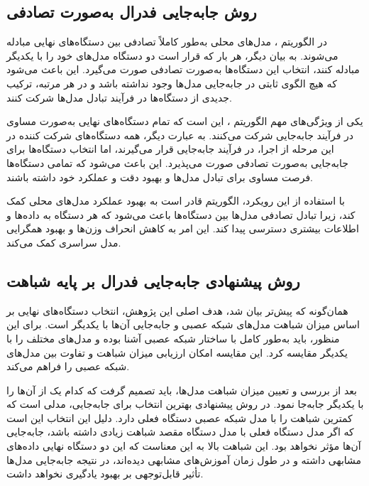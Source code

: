 \subsection{
روش جابه‌جایی فدرال به‌صورت تصادفی
}

در الگوریتم
%
، مدل‌های محلی به‌طور کاملاً تصادفی بین دستگاه‌های نهایی مبادله می‌شوند. به بیان دیگر، هر بار که قرار است دو دستگاه مدل‌های خود را با یکدیگر مبادله کنند، انتخاب این دستگاه‌ها به‌صورت تصادفی صورت می‌گیرد. این باعث می‌شود که هیچ الگوی ثابتی در جابه‌جایی مدل‌ها وجود نداشته باشد و در هر مرتبه، ترکیب جدیدی از دستگاه‌ها در فرآیند تبادل مدل‌ها شرکت کنند.


یکی از ویژگی‌های مهم الگوریتم
%
، این است که تمام دستگاه‌های نهایی به‌صورت مساوی در فرآیند جابه‌جایی شرکت می‌کنند. به عبارت دیگر، همه دستگاه‌های شرکت کننده در این مرحله از اجرا، در فرآیند جابه‌جایی قرار می‌گیرند، اما انتخاب دستگاه‌ها برای جابه‌جایی به‌صورت تصادفی صورت می‌پذیرد. این باعث می‌شود که تمامی دستگاه‌ها فرصت مساوی برای تبادل مدل‌ها و بهبود دقت و عملکرد خود داشته باشند.

با استفاده از این رویکرد، الگوریتم
قادر است به بهبود عملکرد مدل‌های محلی کمک کند، زیرا تبادل تصادفی مدل‌ها بین دستگاه‌ها باعث می‌شود که هر دستگاه به داده‌ها و اطلاعات بیشتری دسترسی پیدا کند. این امر به کاهش انحراف وزن‌ها و بهبود همگرایی مدل سراسری کمک می‌کند.


\subsection{
روش پیشنهادی جابه‌جایی فدرال بر پایه شباهت%
}
همان‌گونه که پیش‌تر بیان شد، هدف اصلی این پژوهش، انتخاب دستگاه‌های نهایی بر اساس میزان شباهت مدل‌های شبکه عصبی و جابه‌جایی آن‌ها با یکدیگر است. برای این منظور، باید به‌طور کامل با ساختار شبکه عصبی آشنا بوده و مدل‌های مختلف را با یکدیگر مقایسه کرد. این مقایسه امکان ارزیابی میزان شباهت و تفاوت بین مدل‌های شبکه عصبی را فراهم می‌کند.

بعد از بررسی و تعیین میزان شباهت مدل‌ها، باید تصمیم گرفت که کدام یک از آن‌ها را با یکدیگر جابه‌جا نمود. در روش پیشنهادی
بهترین انتخاب برای جابه‌جایی، مدلی است که کمترین شباهت را با مدل شبکه عصبی دستگاه فعلی دارد. دلیل این انتخاب این است که اگر مدل دستگاه فعلی با مدل دستگاه مقصد شباهت زیادی داشته باشد، جابه‌جایی آن‌ها مؤثر نخواهد بود. این شباهت بالا به این معناست که این دو دستگاه نهایی داده‌های مشابهی داشته و در طول زمان آموزش‌های مشابهی دیده‌اند، در نتیجه جابه‌جایی مدل‌ها تأثیر قابل‌توجهی بر بهبود یادگیری نخواهد داشت.

